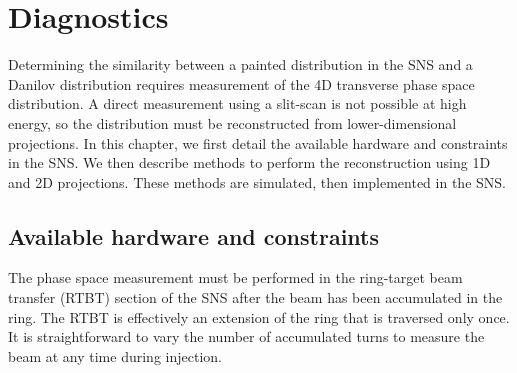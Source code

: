 \chapter{Diagnostics} \label{chap-4}

Determining the similarity between a painted distribution in the SNS and a Danilov distribution requires measurement of the 4D transverse phase space distribution. A direct measurement using a slit-scan \cite{Cathey2018} is not possible at high energy, so the distribution must be reconstructed from lower-dimensional projections. In this chapter, we first detail the available hardware and constraints in the SNS. We then describe methods to perform the reconstruction using 1D and 2D projections. These methods are simulated, then implemented in the SNS.


\section{Available hardware and constraints}

The phase space measurement must be performed in the ring-target beam transfer (RTBT) section of the SNS after the beam has been accumulated in the ring. The RTBT is effectively an extension of the ring that is traversed only once. It is straightforward to vary the number of accumulated turns to measure the beam at any time during injection. 

